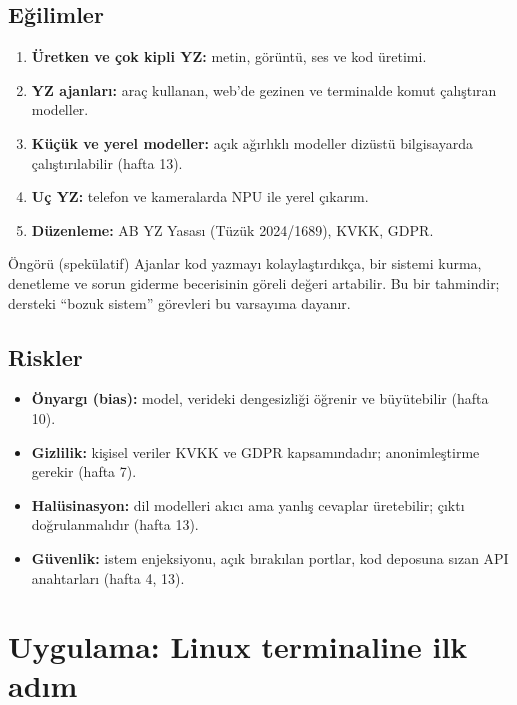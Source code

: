 \documentclass[11pt,a4paper]{article}
\begin{document}
\subsection{Eğilimler}
\begin{enumerate}
  \item \textbf{Üretken ve çok kipli YZ:} metin, görüntü, ses ve kod üretimi.
  \item \textbf{YZ ajanları:} araç kullanan, web'de gezinen ve terminalde komut çalıştıran modeller.
  \item \textbf{Küçük ve yerel modeller:} açık ağırlıklı modeller dizüstü bilgisayarda çalıştırılabilir (hafta 13).
  \item \textbf{Uç YZ:} telefon ve kameralarda NPU ile yerel çıkarım.
  \item \textbf{Düzenleme:} AB YZ Yasası (Tüzük 2024/1689), KVKK, GDPR.
\end{enumerate}

\begin{uyari}{Öngörü (spekülatif)}
Ajanlar kod yazmayı kolaylaştırdıkça, bir sistemi kurma, denetleme ve sorun giderme becerisinin göreli değeri artabilir. Bu bir tahmindir; dersteki ``bozuk sistem'' görevleri bu varsayıma dayanır.
\end{uyari}

\subsection{Riskler}
\begin{itemize}
  \item \textbf{Önyargı (bias):} model, verideki dengesizliği öğrenir ve büyütebilir (hafta 10).
  \item \textbf{Gizlilik:} kişisel veriler KVKK ve GDPR kapsamındadır; anonimleştirme gerekir (hafta 7).
  \item \textbf{Halüsinasyon:} dil modelleri akıcı ama yanlış cevaplar üretebilir; çıktı doğrulanmalıdır (hafta 13).
  \item \textbf{Güvenlik:} istem enjeksiyonu, açık bırakılan portlar, kod deposuna sızan API anahtarları (hafta 4, 13).
\end{itemize}

\section{Uygulama: Linux terminaline ilk adım}
\end{document}
